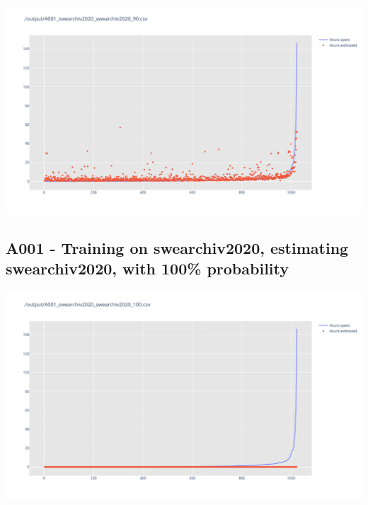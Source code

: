 \includegraphics[width=\textwidth]{Scripts/output/A001_swearchiv2020_swearchiv2020_90.csv.png}

\newpage

\subsection{A001 - Training on swearchiv2020, estimating swearchiv2020, with 100\% probability}

\includegraphics[width=\textwidth]{Scripts/output/A001_swearchiv2020_swearchiv2020_100.csv.png}



